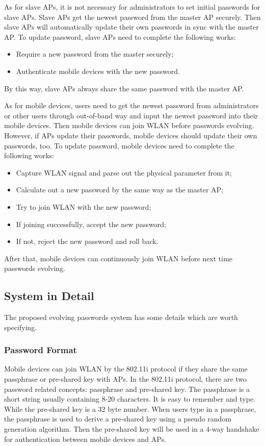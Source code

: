 As for slave APs, it is not necessary for administrators to set initial passwords for slave APs. Slave APs get the newest password from the master AP securely. Then slave APs will automatically update their own passwords in sync with the master AP. To update password, slave APs need to complete the following works: 
\begin{itemize}
	\item Require a new password from the master securely; 
	\item Authenticate mobile devices with the new password. 
\end{itemize}
By this way, slave APs always share the same password with the master AP. 

As for mobile devices, users need to get the newest password from administrators or other users through out-of-band way and input the newest password into their mobile devices. Then mobile devices can join WLAN before passwords evolving. However, if APs update their passwords, mobile devices should update their own passwords, too. To update password, mobile devices need to complete the following works: 
\begin{itemize}
	\item Capture WLAN signal and parse out the physical parameter from it; 
	\item Calculate out a new password by the same way as the master AP; 
	\item Try to join WLAN with the new password; 
	\item If joining successfully, accept the new password; 
	\item If not, reject the new password and roll back. 
\end{itemize}
After that, mobile devices can continuously join WLAN before next time passwords evolving. 

\subsection{System in Detail}
The proposed evolving passwords system has some details which are worth specifying. 

\subsubsection{Password Format}
Mobile devices can join WLAN by the 802.11i protocol if they share the same passphrase or pre-shared key with APs. In the 802.11i protocol, there are two password related concepts: passphrase and pre-shared key. The passphrase is a short string usually containing 8-20 characters. It is easy to remember and type. While the pre-shared key is a 32 byte number. When users type in a passphrase, the passphrase is used to derive a pre-shared key using a pseudo random generation algorithm. Then the pre-shared key will be used in a 4-way handshake for authentication between mobile devices and APs. 

